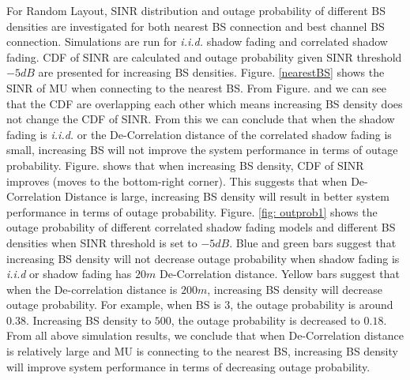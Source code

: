 \documentclass[journal,comsoc]{IEEEtran}
\begin{document}
\par For Random Layout, SINR distribution and outage probability of different BS densities are investigated for both nearest BS connection and best channel BS connection. Simulations are run for \emph{i.i.d.} shadow fading and correlated shadow fading. CDF of SINR are calculated and outage probability given SINR threshold $-5dB$ are presented for increasing BS densities. Figure. \ref{nearestBS} shows the SINR of MU when connecting to the nearest BS. From Figure.  and  we can see that the CDF are overlapping each other which means increasing BS density does not change the CDF of SINR. From this we can conclude that when the shadow fading is \emph{i.i.d.} or the De-Correlation distance of the correlated shadow fading is small, increasing BS will not improve the system performance in terms of outage probability. Figure.   shows that when increasing BS density, CDF of SINR improves (moves to the bottom-right corner). This suggests that when De-Correlation Distance is large, increasing BS density will result in better system performance in terms of outage probability. Figure. \ref{fig: outprob1} shows the outage probability of different correlated shadow fading models and different BS densities when SINR threshold is set to $-5dB$. Blue and green bars suggest that increasing BS density will not decrease outage probability when shadow fading is \emph{i.i.d} or shadow fading has $20m$ De-Correlation distance. Yellow bars suggest that when the De-correlation distance is $200m$, increasing BS density will decrease outage probability. For example, when BS is $3$, the outage probability is around $0.38$. Increasing BS density to $500$, the outage probability is decreased to $0.18$. From all above simulation results, we conclude that when De-Correlation distance is relatively large and MU is connecting to the nearest BS, increasing BS density will improve system performance in terms of decreasing outage probability.
\end{document}
